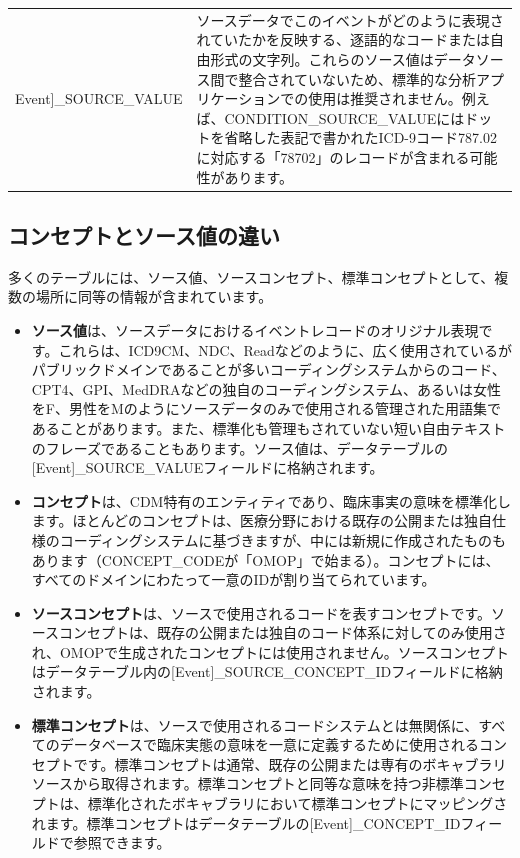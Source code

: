 \documentclass[
  11pt]{book}
\providecommand{\tightlist}{%
  \setlength{\itemsep}{0pt}\setlength{\parskip}{0pt}}
\theoremstyle{definition}
\theoremstyle{definition}
\theoremstyle{definition}
\theoremstyle{definition}
\theoremstyle{remark}
\begin{document}
\begin{longtable}[]{@{}
  >{\raggedright\arraybackslash}p{}
  >{\raggedright\arraybackslash}p{}@{}}
{[}Event{]}\_SOURCE\_VALUE & ソースデータでこのイベントがどのように表現されていたかを反映する、逐語的なコードまたは自由形式の文字列。これらのソース値はデータソース間で整合されていないため、標準的な分析アプリケーションでの使用は推奨されません。例えば、CONDITION\_SOURCE\_VALUEにはドットを省略した表記で書かれたICD-9コード787.02に対応する「78702」のレコードが含まれる可能性があります。 \\
\end{longtable}

\subsection{コンセプトとソース値の違い}\label{concepts-Sources}

多くのテーブルには、ソース値、ソースコンセプト、標準コンセプトとして、複数の場所に同等の情報が含まれています。

\begin{itemize}
\tightlist
\item
  \textbf{ソース値}は、ソースデータにおけるイベントレコードのオリジナル表現です。これらは、ICD9CM、NDC、Readなどのように、広く使用されているがパブリックドメインであることが多いコーディングシステムからのコード、CPT4、GPI、MedDRAなどの独自のコーディングシステム、あるいは女性をF、男性をMのようにソースデータのみで使用される管理された用語集であることがあります。また、標準化も管理もされていない短い自由テキストのフレーズであることもあります。ソース値は、データテーブルの{[}Event{]}\_SOURCE\_VALUEフィールドに格納されます。
\item
  \textbf{コンセプト}は、CDM特有のエンティティであり、臨床事実の意味を標準化します。ほとんどのコンセプトは、医療分野における既存の公開または独自仕様のコーディングシステムに基づきますが、中には新規に作成されたものもあります（CONCEPT\_CODEが「OMOP」で始まる）。コンセプトには、すべてのドメインにわたって一意のIDが割り当てられています。
\item
  \textbf{ソースコンセプト}は、ソースで使用されるコードを表すコンセプトです。ソースコンセプトは、既存の公開または独自のコード体系に対してのみ使用され、OMOPで生成されたコンセプトには使用されません。ソースコンセプトはデータテーブル内の{[}Event{]}\_SOURCE\_CONCEPT\_IDフィールドに格納されます。
\item
  \textbf{標準コンセプト}は、ソースで使用されるコードシステムとは無関係に、すべてのデータベースで臨床実態の意味を一意に定義するために使用されるコンセプトです。標準コンセプトは通常、既存の公開または専有のボキャブラリソースから取得されます。標準コンセプトと同等な意味を持つ非標準コンセプトは、標準化されたボキャブラリにおいて標準コンセプトにマッピングされます。標準コンセプトはデータテーブルの{[}Event{]}\_CONCEPT\_IDフィールドで参照できます。
\end{itemize}
\end{document}
